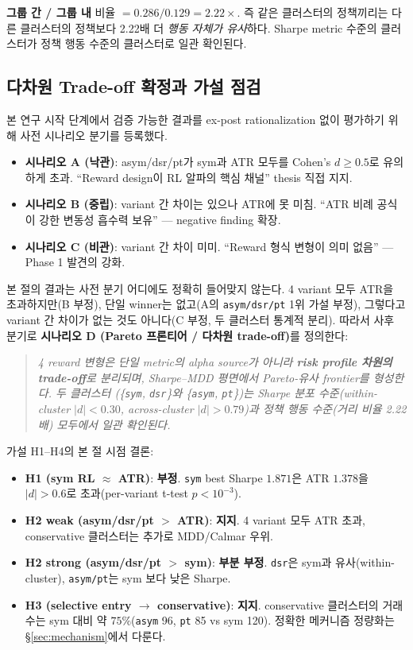 \documentclass[11pt, a4paper]{article}
\begin{document}
\textbf{그룹 간 / 그룹 내} 비율 $= 0.286 / 0.129 = \mathbf{2.22\times}$. 즉
같은 클러스터의 정책끼리는 다른 클러스터의 정책보다 2.22배 더 \emph{행동 자체가
유사}하다. Sharpe metric 수준의 클러스터가 정책 행동 수준의 클러스터로
일관 확인된다.

\subsection{다차원 Trade-off 확정과 가설 점검}
\label{sec:pareto_scenario_d}

본 연구 시작 단계에서 검증 가능한 결과를 ex-post rationalization 없이 평가하기
위해 사전 시나리오 분기를 등록했다.

\begin{itemize}[leftmargin=*]
\item \textbf{시나리오 A (낙관)}: asym/dsr/pt가 sym과 ATR 모두를 Cohen's $d \geq 0.5$로
유의하게 초과. ``Reward design이 RL 알파의 핵심 채널'' thesis 직접 지지.
\item \textbf{시나리오 B (중립)}: variant 간 차이는 있으나 ATR에 못 미침.
``ATR 비례 공식이 강한 변동성 흡수력 보유'' --- negative finding 확장.
\item \textbf{시나리오 C (비관)}: variant 간 차이 미미. ``Reward 형식 변형이
의미 없음'' --- Phase 1 발견의 강화.
\end{itemize}

본 절의 결과는 사전 분기 어디에도 정확히 들어맞지 않는다. 4 variant 모두 ATR을
초과하지만(B 부정), 단일 winner는 없고(A의 \texttt{asym/dsr/pt} 1위 가설 부정), 그렇다고
variant 간 차이가 없는 것도 아니다(C 부정, 두 클러스터 통계적 분리). 따라서 사후
분기로 \textbf{시나리오 D (Pareto 프론티어 / 다차원 trade-off)}를 정의한다:

\begin{quote}
\emph{4 reward 변형은 단일 metric의 alpha source가 아니라 \textbf{risk profile
차원의 trade-off}로 분리되며, Sharpe--MDD 평면에서 Pareto-유사 frontier를
형성한다. 두 클러스터 (\{\texttt{sym}, \texttt{dsr}\}와 \{\texttt{asym},
\texttt{pt}\})는 Sharpe 분포 수준(within-cluster $|d|<0.30$, across-cluster
$|d|>0.79$)과 정책 행동 수준(거리 비율 2.22배) 모두에서 일관 확인된다.}
\end{quote}

가설 H1--H4의 본 절 시점 결론:
\begin{itemize}[leftmargin=*]
\item \textbf{H1 (sym RL $\approx$ ATR)}: \textbf{부정}. \texttt{sym} best Sharpe
$1.871$은 ATR $1.378$을 $|d| > 0.6$로 초과(per-variant t-test $p < 10^{-3}$).
\item \textbf{H2 weak (asym/dsr/pt $>$ ATR)}: \textbf{지지}. 4 variant 모두
ATR 초과, conservative 클러스터는 추가로 MDD/Calmar 우위.
\item \textbf{H2 strong (asym/dsr/pt $>$ sym)}: \textbf{부분 부정}. \texttt{dsr}은
sym과 유사(within-cluster), \texttt{asym/pt}는 sym 보다 낮은 Sharpe.
\item \textbf{H3 (selective entry $\to$ conservative)}: \textbf{지지}. conservative
클러스터의 거래수는 sym 대비 약 $75\%$(\texttt{asym} 96, \texttt{pt} 85 vs sym 120).
정확한 메커니즘 정량화는 \S\ref{sec:mechanism}에서 다룬다.
\end{itemize}
\end{document}
